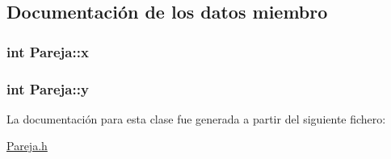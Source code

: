 \subsection{Documentación de los datos miembro}
\hypertarget{class_pareja_a021ebcfa17225b2beb0b4c1da401bcb1}{
\subsubsection[{x}]{\setlength{\rightskip}{0pt plus 5cm}int Pareja\-::x}}\label{class_pareja_a021ebcfa17225b2beb0b4c1da401bcb1}
\hypertarget{class_pareja_a2580474767c2d7ac97f8c3ad953b9e85}{
\subsubsection[{y}]{\setlength{\rightskip}{0pt plus 5cm}int Pareja\-::y}}\label{class_pareja_a2580474767c2d7ac97f8c3ad953b9e85}


La documentación para esta clase fue generada a partir del siguiente fichero\-:\begin{DoxyCompactItemize}
\item 
\hyperlink{_pareja_8h}{Pareja.\-h}\end{DoxyCompactItemize}
